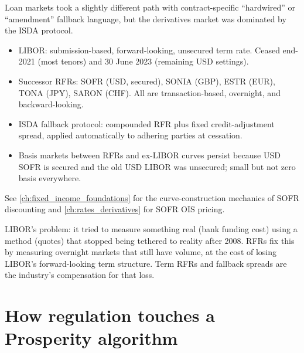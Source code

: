 Loan markets took a slightly different path with contract-specific
``hardwired'' or ``amendment'' fallback language, but the
derivatives market was dominated by the ISDA protocol.

\begin{keyfactbox}
\begin{itemize}
  \item LIBOR: submission-based, forward-looking, unsecured
    term rate.  Ceased end-2021 (most tenors) and
    30 June 2023 (remaining USD settings).
  \item Successor RFRs: SOFR (USD, secured), SONIA (GBP),
    ESTR (EUR), TONA (JPY), SARON (CHF).  All are
    transaction-based, overnight, and backward-looking.
  \item ISDA fallback protocol: compounded RFR plus fixed
    credit-adjustment spread, applied automatically to
    adhering parties at cessation.
  \item Basis markets between RFRs and ex-LIBOR curves
    persist because USD SOFR is secured and the old USD
    LIBOR was unsecured; small but not zero basis everywhere.
\end{itemize}
See \cref{ch:fixed_income_foundations} for the curve-construction
mechanics of SOFR discounting and \cref{ch:rates_derivatives}
for SOFR OIS pricing.
\end{keyfactbox}

\begin{intuitionbox}
LIBOR's problem: it tried to measure something real (bank funding
cost) using a method (quotes) that stopped being tethered to
reality after 2008.  RFRs fix this by measuring overnight markets
that still have volume, at the cost of losing LIBOR's
forward-looking term structure.  Term RFRs and fallback spreads
are the industry's compensation for that loss.
\end{intuitionbox}


\section{How regulation touches a Prosperity algorithm}
\label{sec:prosp_reg}

